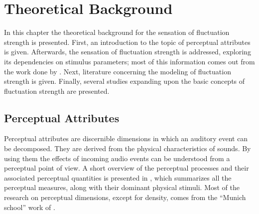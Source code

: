 \documentclass[../main.tex]{subfiles}
\begin{document}
\chapter{Theoretical Background}
\label{cha:theoretical}

In this chapter the theoretical background for the sensation of fluctuation
strength is presented. First, an introduction to the topic of perceptual
attributes is given. Afterwards, the sensation of fluctuation strength is
addressed, exploring its dependencies on stimulus parameters; most of this
information comes out from the work done by \textcite{Fastl2007Psychoacoustics}.
Next, literature concerning the modeling of fluctuation strength is given.
Finally, several studies expanding upon the basic concepts of fluctuation
strength are presented.

\begin{theoreticalbackground}

\section{Perceptual Attributes}

Perceptual attributes are discernible dimensions in which an auditory event can
be decomposed. They are derived from the physical characteristics of sounds. By
using them the effects of incoming audio events can be understood from a
perceptual point of view. A short overview of the perceptual processes and their
associated perceptual quantities is presented in , which
summarizes all the perceptual measures, along with their dominant physical
stimuli. Most of the research on perceptual dimensions, except for density,
comes from the ``Munich school'' work of \textcite{Fastl2007Psychoacoustics}.


\end{theoreticalbackground}
\end{document}
